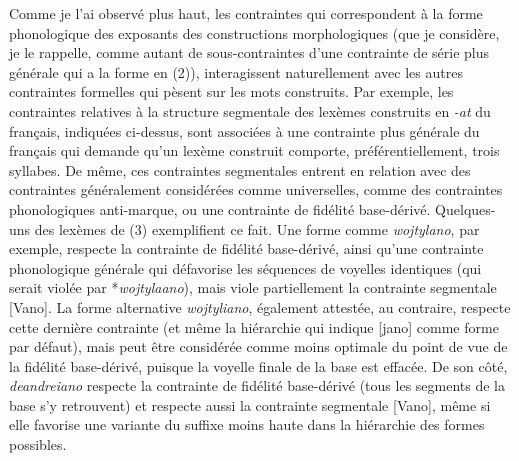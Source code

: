 \documentclass[output=paper]{langsci/langscibook}
\begin{document}
Comme je l'ai observé plus haut, les contraintes qui correspondent à la
forme phonologique des exposants des constructions morphologiques (que
je considère, je le rappelle, comme autant de sous-contraintes d'une
contrainte de série plus générale qui a la forme en (2)), interagissent
naturellement avec les autres contraintes formelles qui pèsent sur les
mots construits. Par exemple, les contraintes relatives à la structure
segmentale des lexèmes construits en \emph{\mbox{-at}} du français, indiquées
ci-dessus, sont associées à une contrainte plus générale du français qui
demande qu'un lexème construit comporte, préférentiellement, trois
syllabes. De même, ces contraintes segmentales entrent en relation avec
des contraintes généralement considérées comme universelles, comme des
con\-traintes phonologiques anti-marque, ou une contrainte de fidélité
base-dérivé. Quelques-uns des lexèmes de (3) exemplifient ce fait. Une
forme comme \emph{wojtylano}, par exemple, respecte la contrainte de
fidélité base-dérivé, ainsi qu'une contrainte phonologique générale qui
défavorise les séquences de voyelles identiques (qui serait violée par
*\emph{wojtylaano}), mais viole partiellement la contrainte segmentale
{[}Vano{]}. La forme alternative \emph{wojtyliano}, également attestée,
au con\-traire, respecte cette dernière contrainte (et même la hiérarchie
qui indique {[}jano{]} comme forme par défaut), mais peut être
considérée comme moins optimale du point de vue de la fidélité
base-dérivé, puisque la voyelle finale de la base est effacée. De son
côté, \emph{deandreiano} respecte la contrainte de fidélité base-dérivé
(tous les segments de la base s'y retrouvent) et respecte aussi la
contrainte segmentale {[}Vano{]}, même si elle favorise une variante du
suffixe moins haute dans la hiérarchie des formes possibles.
\end{document}
